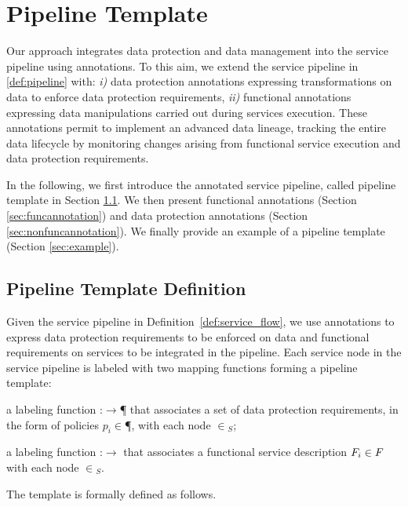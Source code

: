 \section{Pipeline Template}
Our approach integrates data protection and data management into the service pipeline using annotations.
To this aim, we extend the service pipeline in \cref{def:pipeline} with: \emph{i)} data protection annotations expressing transformations on data to enforce data protection requirements, \emph{ii)} functional annotations expressing data manipulations carried out during services execution.
These annotations permit to implement an advanced data lineage, tracking the entire data lifecycle by monitoring changes arising from functional service execution and data protection requirements.

In the following, we first introduce the annotated service pipeline, called pipeline template in Section \ref{sec:templatedefinition}. We then present functional annotations (Section \ref{sec:funcannotation}) and data protection annotations (Section \ref{sec:nonfuncannotation}). We finally provide an example of a pipeline template (Section \ref{sec:example}).


\subsection{Pipeline Template Definition}\label{sec:templatedefinition}
Given the service pipeline in Definition~\ref{def:service_flow}, we use annotations to express data protection requirements to be enforced on data and functional requirements on services to be integrated in the pipeline. Each service node in the service pipeline is labeled with two mapping functions forming a pipeline template:
\begin{enumerate*}[label=\roman*)]
  \item a labeling function \myLambda:\V$\rightarrow$\P{} that associates a set of data protection requirements, in the form of policies $p_i\in$\P{}, with each node $\in$\V$_S$;
  \item a labeling function \myGamma:\V$\rightarrow$\F{} that associates a functional service description $F_i\in F_{}$ with each node $\in$\V$_S$.
\end{enumerate*}

The template is formally defined as follows.


